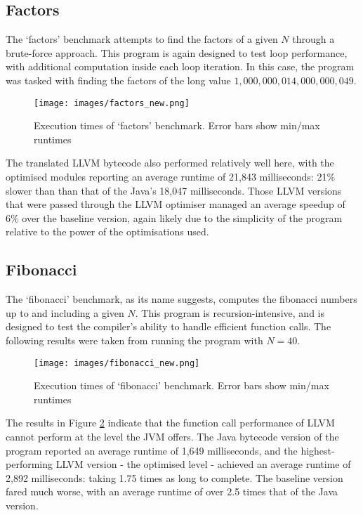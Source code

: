 \subsection*{Factors}

The `factors' benchmark attempts to find the factors of a given $N$ through a brute-force approach. This program is again designed to test loop performance, with additional computation inside each loop iteration. In this case, the program was tasked with finding the factors of the long value $1,000,000,014,000,000,049$.

\begin{figure}[h!]
    \centering
    \texttt{[image: images/factors\_new.png]}
    \caption[Execution times of `factors' benchmark]{Execution times of `factors' benchmark. Error bars show min/max runtimes}
    \label{fig:res_factors}
\end{figure}

The translated LLVM bytecode also performed relatively well here, with the optimised modules reporting an average runtime of 21,843 milliseconds: 21\% slower than than that of the Java's 18,047 milliseconds. Those LLVM versions that were passed through the LLVM optimiser managed an average speedup of 6\% over the baseline version, again likely due to the simplicity of the program relative to the power of the optimisations used.


\subsection*{Fibonacci}

The `fibonacci' benchmark, as its name suggests, computes the fibonacci numbers up to and including a given $N$. This program is recursion-intensive, and is designed to test the compiler's ability to handle efficient function calls. The following results were taken from running the program with $N = 40$.

\begin{figure}[h!]
    \centering
    \texttt{[image: images/fibonacci\_new.png]}
    \caption[Execution times of `fibonacci' benchmark]{Execution times of `fibonacci' benchmark. Error bars show min/max runtimes}
    \label{fig:res_fibonacci}
\end{figure}

The results in Figure \ref{fig:res_fibonacci} indicate that the function call performance of LLVM cannot perform at the level the JVM offers. The Java bytecode version of the program reported an average runtime of 1,649 milliseconds, and the highest-performing LLVM version - the optimised level - achieved an average runtime of 2,892 milliseconds: taking 1.75 times as long to complete. The baseline version fared much worse, with an average runtime of over 2.5 times that of the Java version.


